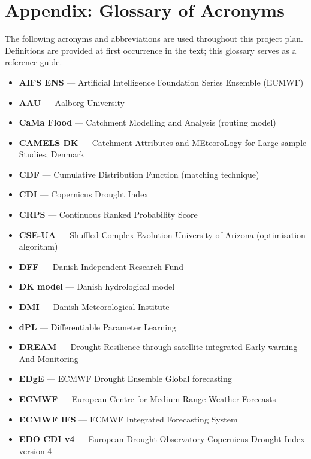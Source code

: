 \section*{Appendix: Glossary of Acronyms}

\begin{note}
The following acronyms and abbreviations are used throughout this project plan. Definitions are provided at first occurrence in the text; this glossary serves as a reference guide.
\end{note}

\begin{itemize}
    \item \textbf{AIFS ENS} --- Artificial Intelligence Foundation Series Ensemble (ECMWF)
    \item \textbf{AAU} --- Aalborg University
    \item \textbf{CaMa Flood} --- Catchment Modelling and Analysis (routing model)
    \item \textbf{CAMELS DK} --- Catchment Attributes and MEteoroLogy for Large-sample Studies, Denmark
    \item \textbf{CDF} --- Cumulative Distribution Function (matching technique)
    \item \textbf{CDI} --- Copernicus Drought Index
    \item \textbf{CRPS} --- Continuous Ranked Probability Score
    \item \textbf{CSE-UA} --- Shuffled Complex Evolution University of Arizona (optimisation algorithm)
    \item \textbf{DFF} --- Danish Independent Research Fund
    \item \textbf{DK model} --- Danish hydrological model
    \item \textbf{DMI} --- Danish Meteorological Institute
    \item \textbf{dPL} --- Differentiable Parameter Learning
    \item \textbf{DREAM} --- Drought Resilience through satellite-integrated Early warning And Monitoring
    \item \textbf{EDgE} --- ECMWF Drought Ensemble Global forecasting
    \item \textbf{ECMWF} --- European Centre for Medium-Range Weather Forecasts
    \item \textbf{ECMWF IFS} --- ECMWF Integrated Forecasting System
    \item \textbf{EDO CDI v4} --- European Drought Observatory Copernicus Drought Index version 4

\end{itemize}
